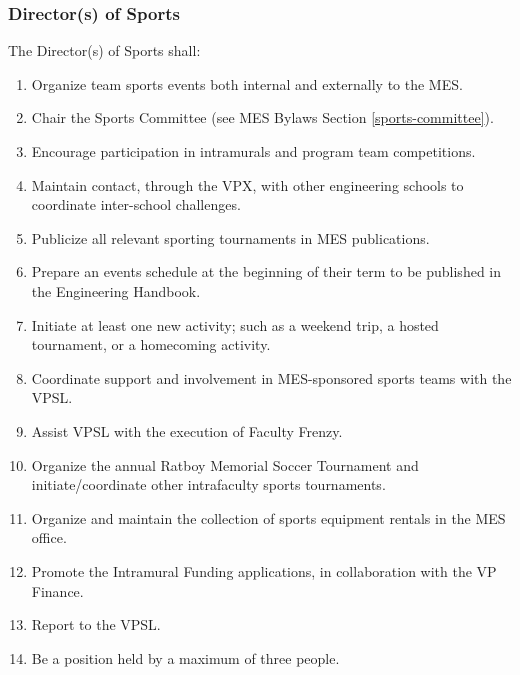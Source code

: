 
\subsubsection{Director(s) of Sports}
\label{directors-of-sports}
The Director(s) of Sports shall:

\begin{enumerate}
 \item
  Organize team sports events both internal and externally to the MES.
 \item
  Chair the Sports Committee (see MES Bylaws Section \ref{sports-committee}).
 \item
  Encourage participation in intramurals and program team competitions.
 \item
  Maintain contact, through the VPX, with other engineering schools to coordinate inter-school challenges.
 \item
  Publicize all relevant sporting tournaments in MES publications.
 \item
  Prepare an events schedule at the beginning of their term to be published in the Engineering Handbook.
 \item
  Initiate at least one new activity; such as a weekend trip, a hosted tournament, or a homecoming activity.
 \item
  Coordinate support and involvement in MES-sponsored sports teams with the VPSL.
 \item
  Assist VPSL with the execution of Faculty Frenzy. 
 \item    
  Organize the annual Ratboy Memorial Soccer Tournament and initiate/coordinate other intrafaculty sports tournaments.
 \item
  Organize and maintain the collection of sports equipment rentals in the MES office.
 \item
  Promote the Intramural Funding applications, in collaboration with the VP Finance.
 \item
  Report to the VPSL.
 \item
  Be a position held by a maximum of three people.
\end{enumerate}